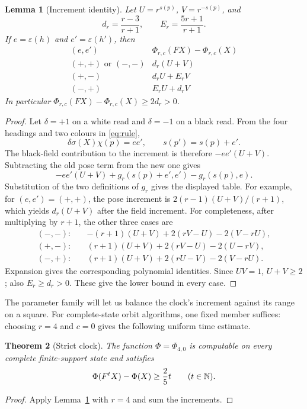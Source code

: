 \documentclass[11pt,a4paper]{article}
\newtheorem{theorem}{Theorem}[section]
\newtheorem{lemma}[theorem]{Lemma}
\theoremstyle{remark}\newtheorem{remark}[theorem]{Remark}
\newcommand{\eps}{\varepsilon}\newcommand{\symdiff}{\mathbin{\triangle}}
\begin{document}
\begin{lemma}[Increment identity]\label{lem:increment}
Let $U=r^{s(p)}$, $V=r^{-s(p)}$, and
\[
 d_r=\frac{r-3}{r+1},\qquad E_r=\frac{5r+1}{r+1}.
\]
If $e=\eps(h)$ and $e'=\eps(h')$, then
\[
\begin{array}{c|c}
 (e,e')&\Phi_{r,c}(FX)-\Phi_{r,c}(X)\\\hline
 (+,+)\text{ or }(-,-)&d_r(U+V)\\
 (+,-)&d_rU+E_rV\\
 (-,+)&E_rU+d_rV
\end{array}
\]
In particular $\Phi_{r,c}(FX)-\Phi_{r,c}(X)\ge2d_r>0$.
\end{lemma}
\begin{proof}
Let $\delta=+1$ on a white read and $\delta=-1$ on a black read. From the
four headings and two colours in \eqref{eq:rule},
\[
 \delta\sigma(X)\chi(p)=ee',\qquad s(p')=s(p)+e'.
\]
The black-field contribution to the increment is therefore
$-ee'(U+V)$. Subtracting the old pose term from the new one gives
\[
 -ee'(U+V)+g_r(s(p)+e',e')-g_r(s(p),e).
\]
Substitution of the two definitions of $g_r$ gives the displayed table.
For example, for $(e,e')=(+,+)$, the pose increment is
$2(r-1)(U+V)/(r+1)$, which yields $d_r(U+V)$ after the field increment.
For completeness, after multiplying by $r+1$, the other three cases are
\begin{align*}
(-,-):\quad&-(r+1)(U+V)+2(rV-U)-2(V-rU),\\
(+,-):\quad& (r+1)(U+V)+2(rV-U)-2(U-rV),\\
(-,+):\quad& (r+1)(U+V)+2(rU-V)-2(V-rU).
\end{align*}
Expansion gives the corresponding polynomial identities. Since $UV=1$, $U+V\ge2$;
also $E_r\ge d_r>0$. These give the lower bound in every case.
\end{proof}

The parameter family will let us balance the clock's increment against its
range on a square. For complete-state orbit algorithms, one fixed member
suffices: choosing $r=4$ and $c=0$ gives the following uniform time estimate.

\begin{theorem}[Strict clock]\label{thm:clock}
The function $\Phi=\Phi_{4,0}$ is computable on every complete finite-support
state and satisfies
\begin{equation}\label{eq:time}
 \Phi(F^tX)-\Phi(X)\ge\frac25t\qquad(t\in\mathbb N).
\end{equation}
\end{theorem}
\begin{proof}
Apply Lemma~\ref{lem:increment} with $r=4$ and sum the increments.
\end{proof}
\end{document}
